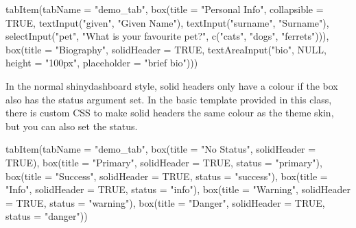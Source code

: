 \documentclass[
  oneside]{book}
\newenvironment{Shaded}{\begin{snugshade}}{\end{snugshade}}
\newcommand{\AttributeTok}[1]{\textcolor[rgb]{0.77,0.63,0.00}{#1}}
\newcommand{\ConstantTok}[1]{\textcolor[rgb]{0.00,0.00,0.00}{#1}}
\newcommand{\FunctionTok}[1]{\textcolor[rgb]{0.00,0.00,0.00}{#1}}
\newcommand{\NormalTok}[1]{#1}
\newcommand{\StringTok}[1]{\textcolor[rgb]{0.31,0.60,0.02}{#1}}
\begin{document}
\begin{Shaded}
\begin{Highlighting}[]
\FunctionTok{tabItem}\NormalTok{(}\AttributeTok{tabName =} \StringTok{"demo\_tab"}\NormalTok{, }\FunctionTok{box}\NormalTok{(}\AttributeTok{title =} \StringTok{"Personal Info"}\NormalTok{, }\AttributeTok{collapsible =} \ConstantTok{TRUE}\NormalTok{, }\FunctionTok{textInput}\NormalTok{(}\StringTok{"given"}\NormalTok{,}
    \StringTok{"Given Name"}\NormalTok{), }\FunctionTok{textInput}\NormalTok{(}\StringTok{"surname"}\NormalTok{, }\StringTok{"Surname"}\NormalTok{), }\FunctionTok{selectInput}\NormalTok{(}\StringTok{"pet"}\NormalTok{, }\StringTok{"What is your favourite pet?"}\NormalTok{,}
    \FunctionTok{c}\NormalTok{(}\StringTok{"cats"}\NormalTok{, }\StringTok{"dogs"}\NormalTok{, }\StringTok{"ferrets"}\NormalTok{))), }\FunctionTok{box}\NormalTok{(}\AttributeTok{title =} \StringTok{"Biography"}\NormalTok{, }\AttributeTok{solidHeader =} \ConstantTok{TRUE}\NormalTok{,}
    \FunctionTok{textAreaInput}\NormalTok{(}\StringTok{"bio"}\NormalTok{, }\ConstantTok{NULL}\NormalTok{, }\AttributeTok{height =} \StringTok{"100px"}\NormalTok{, }\AttributeTok{placeholder =} \StringTok{"brief bio"}\NormalTok{)))}
\end{Highlighting}
\end{Shaded}

In the normal shinydashboard style, solid headers only have a colour if the box also has the status argument set. In the basic template provided in this class, there is custom CSS to make solid headers the same colour as the theme skin, but you can also set the \AttributeTok{status}.

\begin{Shaded}
\begin{Highlighting}[]
\FunctionTok{tabItem}\NormalTok{(}\AttributeTok{tabName =} \StringTok{"demo\_tab"}\NormalTok{, }\FunctionTok{box}\NormalTok{(}\AttributeTok{title =} \StringTok{"No Status"}\NormalTok{, }\AttributeTok{solidHeader =} \ConstantTok{TRUE}\NormalTok{), }\FunctionTok{box}\NormalTok{(}\AttributeTok{title =} \StringTok{"Primary"}\NormalTok{,}
    \AttributeTok{solidHeader =} \ConstantTok{TRUE}\NormalTok{, }\AttributeTok{status =} \StringTok{"primary"}\NormalTok{), }\FunctionTok{box}\NormalTok{(}\AttributeTok{title =} \StringTok{"Success"}\NormalTok{, }\AttributeTok{solidHeader =} \ConstantTok{TRUE}\NormalTok{,}
    \AttributeTok{status =} \StringTok{"success"}\NormalTok{), }\FunctionTok{box}\NormalTok{(}\AttributeTok{title =} \StringTok{"Info"}\NormalTok{, }\AttributeTok{solidHeader =} \ConstantTok{TRUE}\NormalTok{, }\AttributeTok{status =} \StringTok{"info"}\NormalTok{),}
    \FunctionTok{box}\NormalTok{(}\AttributeTok{title =} \StringTok{"Warning"}\NormalTok{, }\AttributeTok{solidHeader =} \ConstantTok{TRUE}\NormalTok{, }\AttributeTok{status =} \StringTok{"warning"}\NormalTok{), }\FunctionTok{box}\NormalTok{(}\AttributeTok{title =} \StringTok{"Danger"}\NormalTok{,}
        \AttributeTok{solidHeader =} \ConstantTok{TRUE}\NormalTok{, }\AttributeTok{status =} \StringTok{"danger"}\NormalTok{))}
\end{Highlighting}
\end{Shaded}
\end{document}

